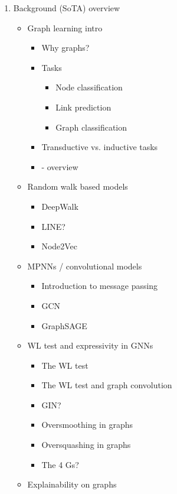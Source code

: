 \documentclass{ctuthesis}
\begin{document}
\maketitle

\begin{enumerate}
	\item Background (SoTA) overview
		\begin{itemize}
			\item Graph learning intro
				\begin{itemize}
					\item Why graphs?
					\item Tasks
						\begin{itemize}
							\item Node classification
							\item Link prediction
							\item Graph classification
						\end{itemize}
					\item Transductive vs. inductive tasks
					\item \cite{gori_new_2005} - overview
				\end{itemize}
			\item Random walk based models
				\begin{itemize}
					\item DeepWalk
					\item LINE?
					\item Node2Vec
				\end{itemize}
			\item MPNNs / convolutional models
				\begin{itemize}
					\item Introduction to message passing
					\item GCN
					\item GraphSAGE
				\end{itemize}
			\item WL test and expressivity in GNNs
				\begin{itemize}
					\item The WL test
					\item The WL test and graph convolution
					\item GIN?
					\item Oversmoothing in graphs
					\item Oversquashing in graphs
					\item The 4 Gs?
				\end{itemize}
			\item Explainability on graphs

\end{itemize}
\end{enumerate}
\end{document}
